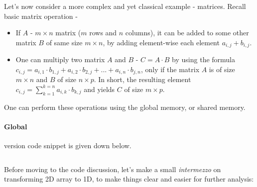 \documentclass[12pt]{article}
\begin{document}
Let's now consider a more complex and yet classical example - matrices. Recall basic matrix operation - 
\begin{itemize}
   \setlength\itemsep{-0.5em}
   \item If $A$ - $m\times n$ matrix ($m$ rows and $n$ columns), it can be added to some 
   other matrix $B$ of same size $m\times n$, by adding element-wise each element $a_{i,j}+b_{i,j}$. 
   \item One can multiply two matrix $A$ and $B$ - $C = A\cdot B$ by using the formula 
   $c_{i,j} = a_{i,1}\cdot b_{1,j} + a_{i,2}\cdot b_{2,j} + ... + a_{i, n}\cdot b_{j,n}$, only if the matrix 
   $A$ is of size $m\times n$ and $B$ of size $n\times p$. In short, the resulting 
   element $c_{i,j} = \sum_{k=1}^{k=n}a_{i,k}\cdot b_{k,j}$ and yields $C$ of size $m\times p$.
\end{itemize}

One can perform these operations using the global memory, or shared memory.

\paragraph{Global} version code snippet is given down below.
\inputminted[linenos=true, frame=single]{cuda}{cucodes/matmulglob.cu}

Before moving to the code discussion, let's make a small \textit{intermezzo}
on transforming 2D array to 1D, to make things clear and easier for further analysis:
\end{document}
